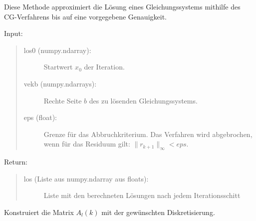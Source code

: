 \documentclass[letterpaper,10pt,ngerman, oneside, openright]{sphinxmanual}
\begin{document}
\begin{fulllineitems}
\begin{fulllineitems}
\end{fulllineitems}
\clearpage
{}


\begin{fulllineitems}
\label{\detokenize{index:sparse_erw.Sparse.cg_meth}}
Diese Methode approximiert die Lösung eines Gleichungssystems mithilfe des CG-Verfahrens
bis auf eine vorgegebene Genauigkeit.

\begin{description}
\item [{Input:}] 
\end{description}
\begin{quote}
\begin{description}
\item[{los0 (numpy.ndarray):}] \leavevmode
Startwert $x_0$ der Iteration.

\item[{vekb (numpy.ndarrays):}] \leavevmode
Rechte Seite $b$ des zu lösenden Gleichungssystems.

\item[{eps (float):}] \leavevmode
Grenze für das Abbruchkriterium. Das Verfahren wird abgebrochen, wenn für das Residuum gilt: $\|r_{k+1}\|_\infty<eps$.

\end{description}
\end{quote}

\begin{description}
\item [{Return:}] 
\end{description}
\begin{quote}
\begin{description}
\item[{los (Liste aus numpy.ndarray aus floats):}] \leavevmode
Liste mit den berechneten Lösungen nach jedem Iterationsschitt

\end{description}
\end{quote}

\end{fulllineitems}


\begin{fulllineitems}
\label{\detokenize{index:sparse_erw.Sparse.constr_mat_l_k}}
Konstruiert die Matrix $A_l(k)$ mit der gewünschten Diskretisierung.


\end{fulllineitems}
\end{fulllineitems}
\end{document}
